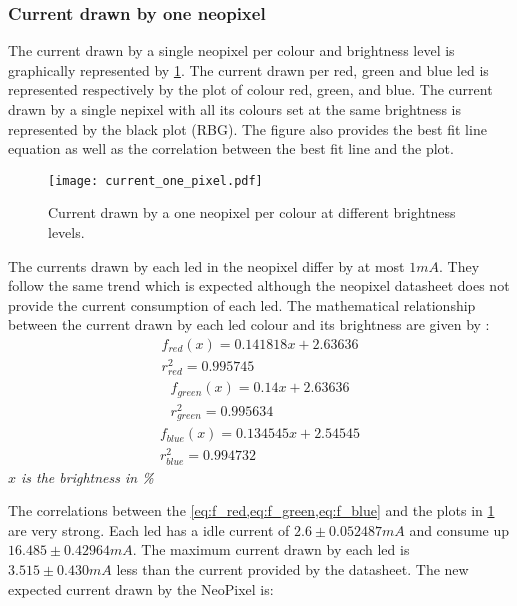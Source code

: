 \subsubsection{Current drawn by one neopixel} \label{current_one}
The current drawn by a single neopixel per colour and brightness level is graphically represented by \cref{fig:current_one_pixel}. The current drawn per red, green and blue led is represented respectively by the plot of colour red, green, and blue. The current drawn by a single nepixel with all its colours set at the same brightness is represented by the black plot (RBG). The figure also provides the best fit line equation as well as the correlation between the best fit line and the plot.  
\begin{figure}[ht]
	\centering
	\texttt{[image: current\_one\_pixel.pdf]}
	\caption{Current drawn by a one neopixel per colour at different brightness levels.}
	\label{fig:current_one_pixel}
\end{figure}
The currents drawn by each led in the neopixel differ by at most $1mA$. They follow the same trend which is expected although the neopixel datasheet does not provide the current consumption of each led. The mathematical relationship between the current drawn by each led colour and its brightness are given by :
\begin{equation}
\label{eq:f_red}
\begin{multlined}
f_{red}(x) = 0.141818x+2.63636 \\
r^2_{red} = 0.995745
\end{multlined}
\end{equation} 
\begin{equation}
\label{eq:f_green}
\begin{multlined}
f_{green}(x) = 0.14x+2.63636 \\
r^2_{green} = 0.995634
\end{multlined}
\end{equation} 
\begin{equation}
\label{eq:f_blue}
\begin{multlined}
f_{blue}(x) = 0.134545x+2.54545 \\
r^2_{blue} = 0.994732
\end{multlined}
\end{equation} 
{
	\centering
	\textit{$x$ is the brightness in \%}\\
}

The correlations between the \cref{eq:f_red,eq:f_green,eq:f_blue} and the plots in \cref{fig:current_one_pixel} are very strong. Each led has a idle current of $2.6 \pm 0.052487 mA$ and consume up $16.485 \pm 0.42964 mA$. The maximum current drawn by each led is $3.515\pm0.430 mA$ less than the current provided by the datasheet. The new expected current drawn by the NeoPixel is:\\

